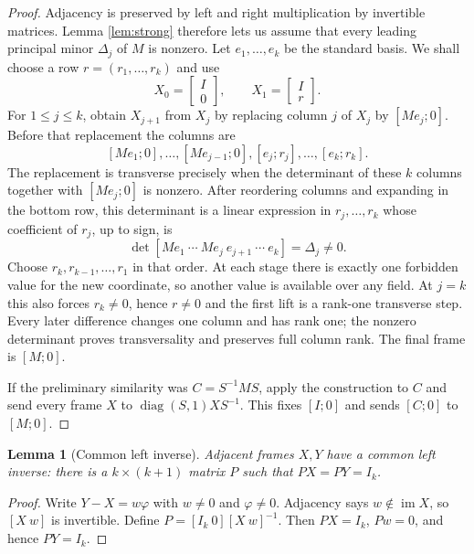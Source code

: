 \documentclass[11pt]{article}
\newtheorem{lemma}[theorem]{Lemma}
\begin{document}
\begin{proof}
Adjacency is preserved by left and right multiplication by invertible
matrices.  Lemma \ref{lem:strong} therefore lets us assume that every leading
principal minor $\Delta_j$ of $M$ is nonzero.  Let $e_1,\ldots,e_k$ be the
standard basis.  We shall choose a row $r=(r_1,\ldots,r_k)$ and use
\[
 X_0=\begin{bmatrix}I\\0\end{bmatrix},\qquad
 X_1=\begin{bmatrix}I\\r\end{bmatrix}.
\]
For $1\le j\le k$, obtain $X_{j+1}$ from $X_j$ by replacing column $j$
of $X_j$ by $[Me_j;0]$.  Before that replacement the columns are
\[
 [Me_1;0],\ldots,[Me_{j-1};0],
 [e_j;r_j],\ldots,[e_k;r_k].
\]
The replacement is transverse precisely when the determinant of these $k$
columns together with $[Me_j;0]$ is nonzero.  After reordering columns and
expanding in the bottom row, this determinant is a linear expression in
$r_j,\ldots,r_k$ whose coefficient of $r_j$, up to sign, is
\[
 \det[Me_1\ \cdots\ Me_j\ e_{j+1}\ \cdots\ e_k]=\Delta_j\ne0.
\]
Choose $r_k,r_{k-1},\ldots,r_1$ in that order.  At each stage there is exactly
one forbidden value for the new coordinate, so another value is available
over any field.  At $j=k$ this also forces $r_k\ne0$, hence $r\ne0$ and the
first lift is a rank-one transverse step.  Every later difference changes
one column and has rank one; the nonzero determinant proves transversality
and preserves full column rank.  The final frame is $[M;0]$.

If the preliminary similarity was $C=S^{-1}MS$, apply the construction to
$C$ and send every frame $X$ to $\operatorname{diag}(S,1)XS^{-1}$.  This fixes
$[I;0]$ and sends $[C;0]$ to $[M;0]$.
\end{proof}

\begin{lemma}[Common left inverse]\label{lem:left}
Adjacent frames $X,Y$ have a common left inverse: there is a
$k\times(k+1)$ matrix $P$ such that $PX=PY=I_k$.
\end{lemma}

\begin{proof}
Write $Y-X=w\varphi$ with $w\ne0$ and $\varphi\ne0$.  Adjacency says
$w\notin\operatorname{im}X$, so $[X\ w]$ is invertible.  Define
$P=[I_k\ 0][X\ w]^{-1}$.  Then $PX=I_k$, $Pw=0$, and hence $PY=I_k$.
\end{proof}
\end{document}
